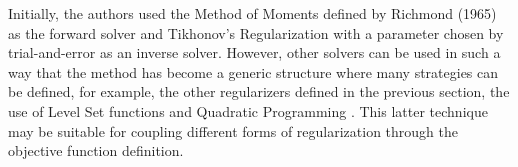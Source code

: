 			Initially, the authors used the Method of Moments defined by Richmond (1965) as the forward solver and Tikhonov's Regularization with a parameter chosen by trial-and-error as an inverse solver. However, other solvers can be used in such a way that the method has become a generic structure where many strategies can be defined, for example, the other regularizers defined in the previous section, the use of Level Set functions \citep{shah2018fast} and Quadratic Programming \citep{batista2021quadratic}. This latter technique may be suitable for coupling different forms of regularization through the objective function definition.
			
